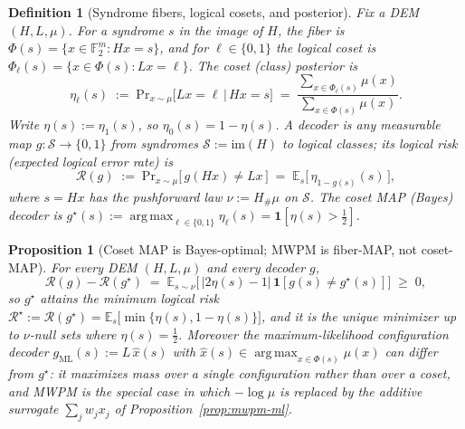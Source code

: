\documentclass[aps,prxquantum,twocolumn,superscriptaddress,nofootinbib,longbibliography]{revtex4-2}
\newtheorem{proposition}[theorem]{Proposition}
\newtheorem{definition}{Definition}
\DeclareMathOperator*{\argmax}{arg\,max}
\newcommand{\F}{\mathbb{F}}
\newcommand{\E}{\mathbb{E}}
\newcommand{\PR}{\mathrm{Pr}}
\newcommand{\ind}[1]{\mathbf{1}\!\left[#1\right]}
\newcommand{\cS}{\mathcal{S}}
\newcommand{\Risk}{\mathcal{R}}
\begin{document}
\begin{definition}[Syndrome fibers, logical cosets, and posterior]
\label{def:coset}
Fix a DEM $(H,L,\mu)$. For a syndrome $s$ in the image of $H$, the
\emph{fiber} is $\Phi(s)=\{x\in\F_2^m: Hx=s\}$, and for $\ell\in\{0,1\}$ the
\emph{logical coset} is $\Phi_\ell(s)=\{x\in\Phi(s): Lx=\ell\}$. The
\emph{coset (class) posterior} is
\begin{equation}
\label{eq:posterior}
  \eta_\ell(s)\;:=\;\PR_{x\sim\mu}\!\big[Lx=\ell \,\big|\, Hx=s\big]
  \;=\;\frac{\sum_{x\in\Phi_\ell(s)}\mu(x)}{\sum_{x\in\Phi(s)}\mu(x)} .
\end{equation}
Write $\eta(s):=\eta_1(s)$, so $\eta_0(s)=1-\eta(s)$. A decoder is any
measurable map $g:\cS\to\{0,1\}$ from syndromes $\cS:=\mathrm{im}(H)$ to logical
classes; its \emph{logical risk} (expected logical error rate) is
\begin{equation}
\label{eq:risk}
  \Risk(g)\;:=\;\PR_{x\sim\mu}\!\big[\,g(Hx)\neq Lx\,\big]
  \;=\;\E_{s}\big[\,\eta_{1-g(s)}(s)\,\big],
\end{equation}
where $s=Hx$ has the pushforward law $\nu:=H_\#\mu$ on $\cS$. The
\emph{coset MAP} (Bayes) decoder is
$g^\star(s):=\argmax_{\ell\in\{0,1\}}\eta_\ell(s)=\ind{\eta(s)>\tfrac12}$.
\end{definition}

\begin{proposition}[Coset MAP is Bayes-optimal; MWPM is fiber-MAP, not coset-MAP]
\label{prop:bayes-opt}
For every DEM $(H,L,\mu)$ and every decoder $g$,
\begin{equation}
\label{eq:bayes-gap}
  \Risk(g)-\Risk(g^\star)
  \;=\;\E_{s\sim\nu}\Big[\,\big|2\eta(s)-1\big|\,
        \ind{g(s)\neq g^\star(s)}\Big]\;\ge\;0 ,
\end{equation}
so $g^\star$ attains the minimum logical risk $\Risk^\star:=\Risk(g^\star)=
\E_{s}\big[\min\{\eta(s),1-\eta(s)\}\big]$, and it is the unique minimizer up to
$\nu$-null sets where $\eta(s)=\tfrac12$. Moreover the maximum-likelihood
configuration decoder $g_{\mathrm{ML}}(s):=L\,\hat x(s)$ with
$\hat x(s)\in\argmax_{x\in\Phi(s)}\mu(x)$ can differ from $g^\star$: it maximizes
mass over a \emph{single} configuration rather than over a coset, and MWPM is the
special case in which $-\log\mu$ is replaced by the additive surrogate
$\sum_j w_j x_j$ of Proposition~\ref{prop:mwpm-ml}.
\end{proposition}
\end{document}
